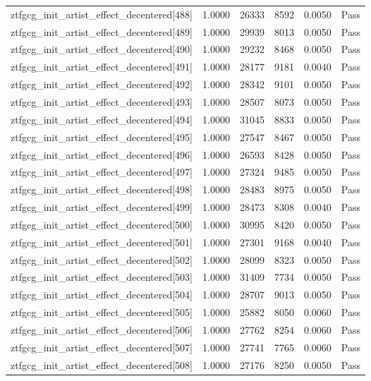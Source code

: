\begin{table}[htbp]
\begin{tabular}{llrrll}
ztfgcg\_init\_artist\_effect\_decentered[488] & 1.0000 & 26333 & 8592 & 0.0050 & Pass \\
ztfgcg\_init\_artist\_effect\_decentered[489] & 1.0000 & 29939 & 8013 & 0.0050 & Pass \\
ztfgcg\_init\_artist\_effect\_decentered[490] & 1.0000 & 29232 & 8468 & 0.0050 & Pass \\
ztfgcg\_init\_artist\_effect\_decentered[491] & 1.0000 & 28177 & 9181 & 0.0040 & Pass \\
ztfgcg\_init\_artist\_effect\_decentered[492] & 1.0000 & 28342 & 9101 & 0.0050 & Pass \\
ztfgcg\_init\_artist\_effect\_decentered[493] & 1.0000 & 28507 & 8073 & 0.0050 & Pass \\
ztfgcg\_init\_artist\_effect\_decentered[494] & 1.0000 & 31045 & 8833 & 0.0050 & Pass \\
ztfgcg\_init\_artist\_effect\_decentered[495] & 1.0000 & 27547 & 8467 & 0.0050 & Pass \\
ztfgcg\_init\_artist\_effect\_decentered[496] & 1.0000 & 26593 & 8428 & 0.0050 & Pass \\
ztfgcg\_init\_artist\_effect\_decentered[497] & 1.0000 & 27324 & 9485 & 0.0050 & Pass \\
ztfgcg\_init\_artist\_effect\_decentered[498] & 1.0000 & 28483 & 8975 & 0.0050 & Pass \\
ztfgcg\_init\_artist\_effect\_decentered[499] & 1.0000 & 28473 & 8308 & 0.0040 & Pass \\
ztfgcg\_init\_artist\_effect\_decentered[500] & 1.0000 & 30995 & 8420 & 0.0050 & Pass \\
ztfgcg\_init\_artist\_effect\_decentered[501] & 1.0000 & 27301 & 9168 & 0.0040 & Pass \\
ztfgcg\_init\_artist\_effect\_decentered[502] & 1.0000 & 28099 & 8323 & 0.0050 & Pass \\
ztfgcg\_init\_artist\_effect\_decentered[503] & 1.0000 & 31409 & 7734 & 0.0050 & Pass \\
ztfgcg\_init\_artist\_effect\_decentered[504] & 1.0000 & 28707 & 9013 & 0.0050 & Pass \\
ztfgcg\_init\_artist\_effect\_decentered[505] & 1.0000 & 25882 & 8050 & 0.0060 & Pass \\
ztfgcg\_init\_artist\_effect\_decentered[506] & 1.0000 & 27762 & 8254 & 0.0060 & Pass \\
ztfgcg\_init\_artist\_effect\_decentered[507] & 1.0000 & 27741 & 7765 & 0.0060 & Pass \\
ztfgcg\_init\_artist\_effect\_decentered[508] & 1.0000 & 27176 & 8250 & 0.0050 & Pass \\

\end{tabular}
\end{table}
